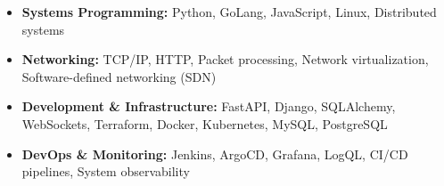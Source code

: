 
\begin{cvskills}

\setlength{\leftmargini}{1em}
\begin{itemize}
    \item \textbf{Systems Programming:} Python, GoLang, JavaScript, Linux, Distributed systems
    \item \textbf{Networking:} TCP/IP, HTTP, Packet processing, Network virtualization, Software-defined networking (SDN)
    \item \textbf{Development \& Infrastructure:} FastAPI, Django, SQLAlchemy, WebSockets, Terraform, Docker, Kubernetes, MySQL, PostgreSQL
    \item \textbf{DevOps \& Monitoring:} Jenkins, ArgoCD, Grafana, LogQL, CI/CD pipelines, System observability
\end{itemize}

\end{cvskills}
